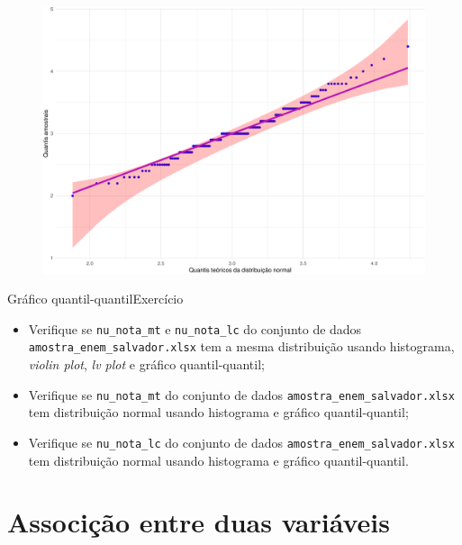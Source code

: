 \documentclass[
  10pt,
  ignorenonframetext,
]{beamer}
\providecommand{\tightlist}{%
  \setlength{\itemsep}{0pt}\setlength{\parskip}{0pt}}\usepackage{longtable,booktabs,array}
\begin{document}
\begin{frame}
\begin{figure}

{\centering \includegraphics[width=1\textwidth,height=\textheight]{exploracao-visualizacao_files/figure-beamer/unnamed-chunk-125-1.pdf}

}

\end{figure}
\end{frame}

\begin{frame}[fragile]{Gráfico quantil-quantil\newline Exercício}
\protect\hypertarget{gruxe1fico-quantil-quantilexercuxedcio}{}
\begin{itemize}
\tightlist
\item
  Verifique se \texttt{nu\_nota\_mt} e \texttt{nu\_nota\_lc} do conjunto
  de dados \texttt{amostra\_enem\_salvador.xlsx} tem a mesma
  distribuição usando histograma, \emph{violin plot}, \emph{lv plot} e
  gráfico quantil-quantil;
\item
  Verifique se \texttt{nu\_nota\_mt} do conjunto de dados
  \texttt{amostra\_enem\_salvador.xlsx} tem distribuição normal usando
  histograma e gráfico quantil-quantil;
\item
  Verifique se \texttt{nu\_nota\_lc} do conjunto de dados
  \texttt{amostra\_enem\_salvador.xlsx} tem distribuição normal usando
  histograma e gráfico quantil-quantil.
\end{itemize}
\end{frame}

\hypertarget{associuxe7uxe3o-entre-duas-variuxe1veis}{%
\section{Associção entre duas
variáveis}\label{associuxe7uxe3o-entre-duas-variuxe1veis}}
\end{document}
